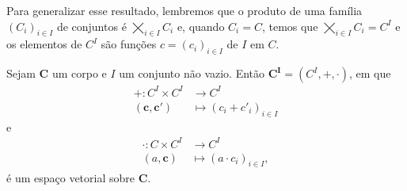Para generalizar esse resultado, lembremos que o produto de uma família $(C_i)_{i \in I}$ de conjuntos é $\bigtimes_{i \in I} C_i$ e, quando $C_i=C$, temos que $\bigtimes_{i \in I} C_i = C^I$ e os elementos de $C^I$ são funções $c=(c_i)_{i \in I}$ de $I$ em $C$.

\begin{prop}[EXERCÍCIO]
	Sejam $\bm C$ um corpo e $I$ um conjunto não vazio. Então $\bm {C^I}=(C^I,\bm +,\bm\cdot)$, em que
	\begin{align*}
	\bm + : C^I \times C^I &\to C^I \\
		(\bm c,\bm c') &\mapsto (c_i+c'_i)_{i \in I}
	\end{align*}
e
	\begin{align*}
	\bm\cdot : C \times C^I &\to C^I \\
		(a,\bm c) &\mapsto (a \cdot c_i)_{i \in I},
	\end{align*}
é um espaço vetorial sobre $\bm C$.
\end{prop}

